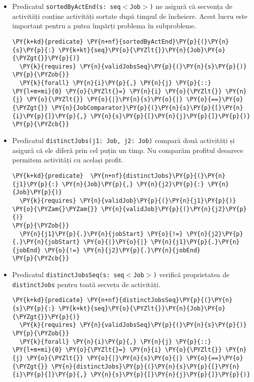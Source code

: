 \begin{itemize}
    \item Predicatul \texttt{sortedByActEnd(s: seq$<$Job$>$)} ne asigură că secvența de activități conține activități sortate după timpul de încheiere. Acest lucru este important pentru a putea împărți problema în subprobleme.   \begin{Verbatim}[commandchars=\\\{\}, fontsize=\footnotesize]
\PY{k+kd}{predicate} \PY{n+nf}{sortedByActEnd}\PY{p}{(}\PY{n}{s}\PY{p}{:} \PY{k+kt}{seq}\PY{o}{\PYZlt{}}\PY{n}{Job}\PY{o}{\PYZgt{}}\PY{p}{)}
  \PY{k}{requires} \PY{n}{validJobsSeq}\PY{p}{(}\PY{n}{s}\PY{p}{)}
\PY{p}{\PYZob{}}
  \PY{k}{forall} \PY{n}{i}\PY{p}{,} \PY{n}{j} \PY{p}{::} \PY{l+m+mi}{0} \PY{o}{\PYZlt{}=} \PY{n}{i} \PY{o}{\PYZlt{}} \PY{n}{j} \PY{o}{\PYZlt{}} \PY{o}{|}\PY{n}{s}\PY{o}{|} \PY{o}{==}\PY{o}{\PYZgt{}} \PY{n}{JobComparator}\PY{p}{(}\PY{n}{s}\PY{p}{[}\PY{n}{i}\PY{p}{]}\PY{p}{,} \PY{n}{s}\PY{p}{[}\PY{n}{j}\PY{p}{]}\PY{p}{)}
\PY{p}{\PYZcb{}}
\end{Verbatim}
    \item Predicatul \texttt{distinctJobs(j1: Job, j2: Job)} compară două activități și asigură că ele diferă prin cel puțin un timp. Nu comparăm profitul deoarece permitem activități cu același profit.  \begin{Verbatim}[commandchars=\\\{\}, fontsize=\footnotesize]
\PY{k+kd}{predicate}  \PY{n+nf}{distinctJobs}\PY{p}{(}\PY{n}{j1}\PY{p}{:} \PY{n}{Job}\PY{p}{,} \PY{n}{j2}\PY{p}{:} \PY{n}{Job}\PY{p}{)}
  \PY{k}{requires} \PY{n}{validJob}\PY{p}{(}\PY{n}{j1}\PY{p}{)} \PY{o}{\PYZam{}\PYZam{}} \PY{n}{validJob}\PY{p}{(}\PY{n}{j2}\PY{p}{)}
\PY{p}{\PYZob{}}
  \PY{n}{j1}\PY{p}{.}\PY{n}{jobStart} \PY{o}{!=} \PY{n}{j2}\PY{p}{.}\PY{n}{jobStart} \PY{o}{|}\PY{o}{|} \PY{n}{j1}\PY{p}{.}\PY{n}{jobEnd} \PY{o}{!=} \PY{n}{j2}\PY{p}{.}\PY{n}{jobEnd}
\PY{p}{\PYZcb{}}
\end{Verbatim}
    \item Predicatul \texttt{distinctJobsSeq(s: seq$<$Job$>$)} verifică proprietatea de \\
    \texttt{distinctJobs} pentru toată secveța de activități. \begin{Verbatim}[commandchars=\\\{\}, fontsize=\footnotesize]
    \PY{k+kd}{predicate} \PY{n+nf}{distinctJobsSeq}\PY{p}{(}\PY{n}{s}\PY{p}{:} \PY{k+kt}{seq}\PY{o}{\PYZlt{}}\PY{n}{Job}\PY{o}{\PYZgt{}}\PY{p}{)}
  \PY{k}{requires} \PY{n}{validJobsSeq}\PY{p}{(}\PY{n}{s}\PY{p}{)}
\PY{p}{\PYZob{}}
  \PY{k}{forall} \PY{n}{i}\PY{p}{,} \PY{n}{j} \PY{p}{::} \PY{l+m+mi}{0} \PY{o}{\PYZlt{}=} \PY{n}{i} \PY{o}{\PYZlt{}} \PY{n}{j} \PY{o}{\PYZlt{}} \PY{o}{|}\PY{n}{s}\PY{o}{|} \PY{o}{==}\PY{o}{\PYZgt{}} \PY{n}{distinctJobs}\PY{p}{(}\PY{n}{s}\PY{p}{[}\PY{n}{i}\PY{p}{]}\PY{p}{,} \PY{n}{s}\PY{p}{[}\PY{n}{j}\PY{p}{]}\PY{p}{)}

\end{Verbatim}
\end{itemize}
